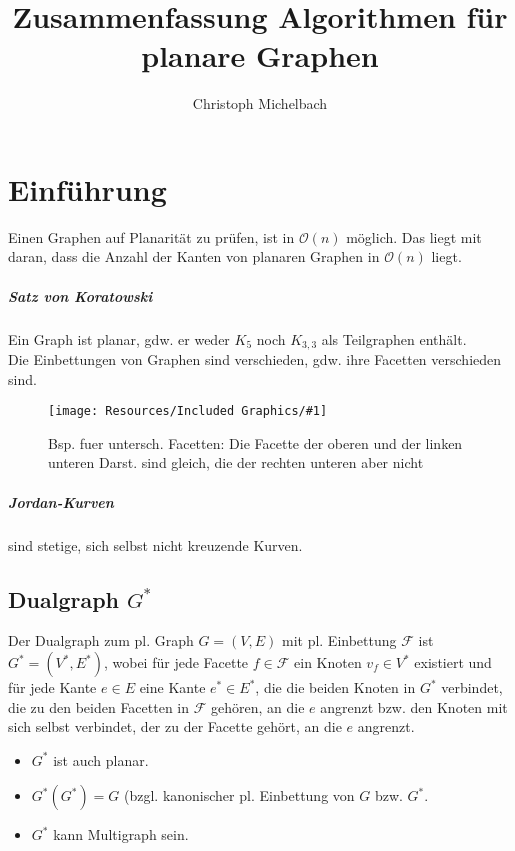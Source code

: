 \documentclass[a4paper,11pt]{report}
\title{Zusammenfassung Algorithmen für planare Graphen}
\author{Christoph Michelbach}
\newcommand{\fig}[2]{
    \begin{figure}[h]
        \begin{center}
            \texttt{[image: Resources/Included Graphics/\#1]}
            \caption{#1}
            \label{fig:#1}
        \end{center}
    \end{figure}
}
\begin{document}
\maketitle
\tableofcontents

\chapter{Einführung}
Einen Graphen auf Planarität zu prüfen, ist in $\mathcal{O}(n)$ möglich. Das liegt mit daran, dass die Anzahl der Kanten von planaren Graphen in $\mathcal{O}(n)$ liegt.\\

\paragraph{Satz von Koratowski} Ein Graph ist planar, gdw. er weder $K_5$ noch $K_{3, 3}$ als Teilgraphen enthält.\\

Die Einbettungen von Graphen sind verschieden, gdw. ihre Facetten verschieden sind.
\fig{Bsp. fuer untersch. Facetten: Die Facette der oberen und der linken unteren Darst. sind gleich, die der rechten unteren aber nicht}{.7}

\paragraph{Jordan-Kurven} sind stetige, sich selbst nicht kreuzende Kurven.\\


\section{Dualgraph $G^*$}
Der Dualgraph zum pl. Graph $G = (V, E)$ mit pl. Einbettung $\mathcal{F}$ ist $G^* = (V^*, E^*)$, wobei für jede Facette $f \in \mathcal{F}$ ein Knoten $v_f \in V^*$ existiert und für jede Kante $e \in E$ eine Kante $e^* \in E^*$, die die beiden Knoten in $G^*$ verbindet, die zu den beiden Facetten in $\mathcal{F}$ gehören, an die $e$ angrenzt bzw. den Knoten mit sich selbst verbindet, der zu der Facette gehört, an die $e$ angrenzt.\\

\begin{itemize}
    \item $G^*$ ist auch planar.
    \item $G^*(G^*) = G$ (bzgl. kanonischer pl. Einbettung von $G$ bzw. $G^*$.
    \item $G^*$ kann Multigraph sein.
\end{itemize}
\end{document}
